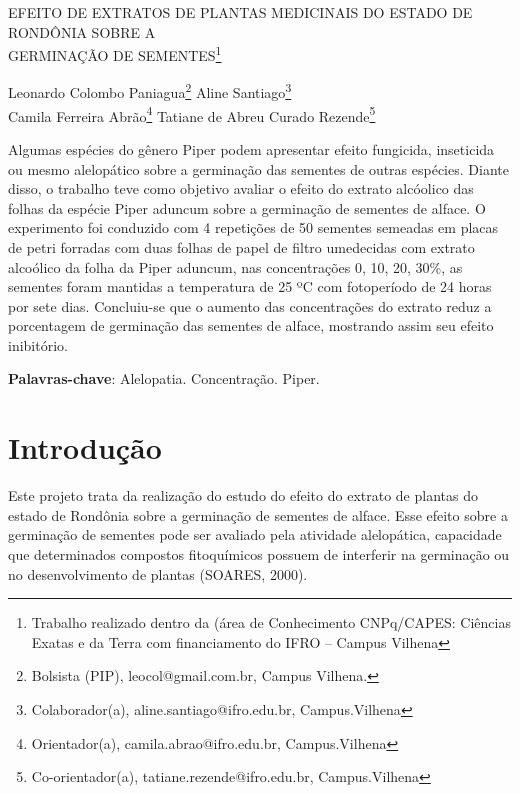 \documentclass[article,12pt,onesidea,4paper,english,brazil]{abntex2}
\begin{document}
	
	
	\frenchspacing 
	
	\begin{center}
		\LARGE EFEITO DE EXTRATOS DE PLANTAS MEDICINAIS DO ESTADO DE RONDÔNIA SOBRE A\\GERMINAÇÃO DE SEMENTES\footnote{Trabalho realizado dentro da (área de Conhecimento CNPq/CAPES: Ciências Exatas e da Terra com financiamento do IFRO – Campus Vilhena}
		
		\normalsize
		Leonardo Colombo Paniagua\footnote{Bolsista (PIP), leocol@gmail.com.br, Campus Vilhena.} 
		Aline Santiago\footnote{Colaborador(a), aline.santiago@ifro.edu.br, Campus.Vilhena} \\
		Camila Ferreira Abrão\footnote{Orientador(a), camila.abrao@ifro.edu.br, Campus.Vilhena} 
		 Tatiane de Abreu Curado Rezende\footnote{Co-orientador(a), tatiane.rezende@ifro.edu.br, Campus.Vilhena} 
	\end{center}
	
	\begin{resumoumacoluna}
		Algumas espécies do gênero Piper podem apresentar efeito fungicida, inseticida ou mesmo alelopático sobre a germinação das sementes de outras espécies. Diante disso, o trabalho teve como objetivo avaliar o efeito do extrato alcóolico das folhas da espécie Piper aduncum sobre a germinação de sementes de alface. O experimento foi conduzido com 4 repetições de 50 sementes semeadas em placas de petri forradas com duas folhas de papel de filtro umedecidas com extrato alcoólico da folha da Piper aduncum, nas concentrações 0, 10, 20, 30\%, as sementes foram mantidas a temperatura de 25 ºC com fotoperíodo de 24 horas por sete dias. Concluiu-se que o aumento das concentrações do extrato reduz a porcentagem de germinação das sementes de alface, mostrando assim seu efeito inibitório.
		
		\vspace{\onelineskip}
		
		\noindent
		\textbf{Palavras-chave}: Alelopatia. Concentração. Piper.
		
	\end{resumoumacoluna}
	
	\section*{Introdução}
	
	Este projeto trata da realização do estudo do efeito do extrato de plantas do estado de Rondônia sobre a germinação de sementes de alface. Esse efeito sobre a germinação de sementes pode ser avaliado pela atividade alelopática, capacidade que determinados compostos fitoquímicos possuem de interferir na germinação ou no desenvolvimento de plantas (SOARES, 2000).
	
\end{document}
